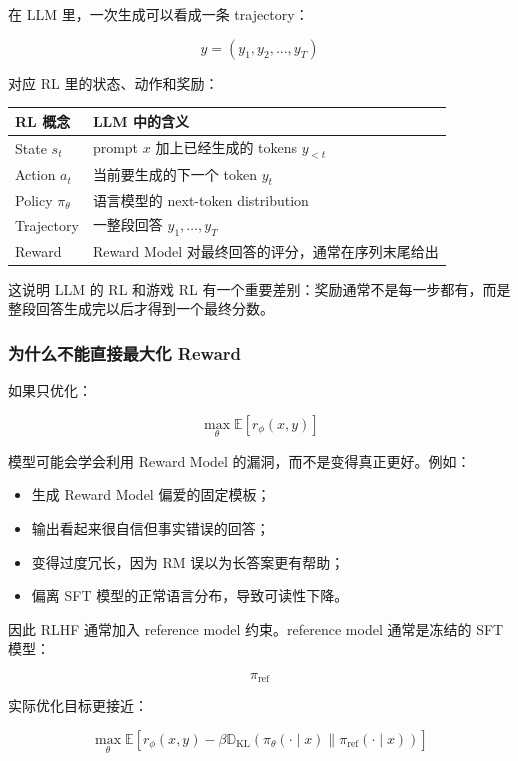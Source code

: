 在 LLM 里，一次生成可以看成一条 trajectory：

\[
y = (y_1, y_2, \ldots, y_T)
\]

对应 RL 里的状态、动作和奖励：

\begin{center}
{\small
\begin{tabular}{p{3cm}p{9.8cm}}
\hline
\textbf{RL 概念} & \textbf{LLM 中的含义} \\
\hline
State $s_t$ & prompt $x$ 加上已经生成的 tokens $y_{<t}$ \\
Action $a_t$ & 当前要生成的下一个 token $y_t$ \\
Policy $\pi_\theta$ & 语言模型的 next-token distribution \\
Trajectory & 一整段回答 $y_1,\ldots,y_T$ \\
Reward & Reward Model 对最终回答的评分，通常在序列末尾给出 \\
\hline
\end{tabular}
}
\end{center}

这说明 LLM 的 RL 和游戏 RL 有一个重要差别：奖励通常不是每一步都有，而是整段回答生成完以后才得到一个最终分数。

\subsubsection{为什么不能直接最大化 Reward}

如果只优化：

\[
\max_\theta \mathbb{E}[r_\phi(x, y)]
\]

模型可能会学会利用 Reward Model 的漏洞，而不是变得真正更好。例如：

\begin{itemize}[leftmargin=1.5em]
  \item 生成 Reward Model 偏爱的固定模板；
  \item 输出看起来很自信但事实错误的回答；
  \item 变得过度冗长，因为 RM 误以为长答案更有帮助；
  \item 偏离 SFT 模型的正常语言分布，导致可读性下降。
\end{itemize}

因此 RLHF 通常加入 reference model 约束。reference model 通常是冻结的 SFT 模型：

\[
\pi_\text{ref}
\]

实际优化目标更接近：

\[
\max_\theta
\mathbb{E}
\left[
r_\phi(x, y)
-
\beta
\mathbb{D}_\text{KL}
\left(
\pi_\theta(\cdot \mid x)
\|
\pi_\text{ref}(\cdot \mid x)
\right)
\right]
\]

